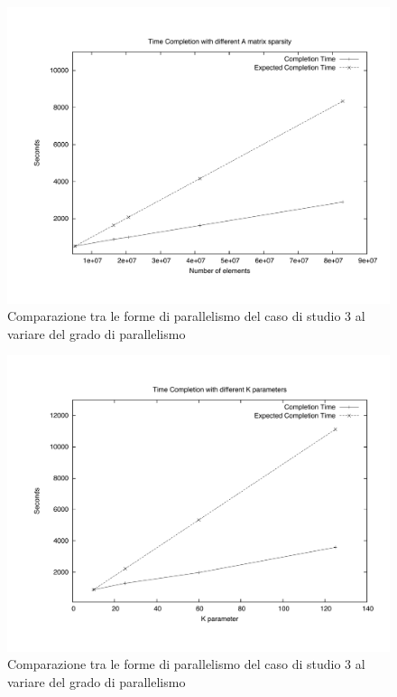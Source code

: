 \begin{figure}[th]
	\centerline{
		\mbox{\includegraphics[scale=0.45]{HadoopTest/PsFiles/DeltaVar.pdf}}
	}
	\caption{Comparazione tra le forme di parallelismo del caso di studio 3 al variare del grado di parallelismo} 
\end{figure}

\begin{figure}[th]
	\centerline{
		\mbox{\includegraphics[scale=0.45]{HadoopTest/PsFiles/kVar.pdf}}
	}
	\caption{Comparazione tra le forme di parallelismo del caso di studio 3 al variare del grado di parallelismo} 
\end{figure}

